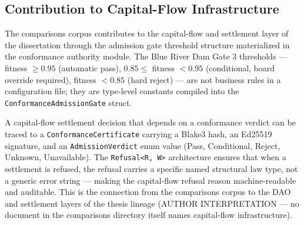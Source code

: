 \subsection{Contribution to Capital-Flow Infrastructure}
\label{sec:comparisons-contribution-capital}

The comparisons corpus contributes to the capital-flow and settlement layer of the
dissertation through the admission gate threshold structure materialized in the
conformance authority module. The Blue River Dam Gate 3 thresholds --- fitness
$\geq 0.95$ (automatic pass), $0.85 \leq$ fitness $< 0.95$ (conditional, board
override required), fitness $< 0.85$ (hard reject) --- are not business rules in
a configuration file; they are type-level constants compiled into the
\texttt{ConformanceAdmissionGate} struct.

A capital-flow settlement decision that depends on a conformance verdict can be
traced to a \texttt{ConformanceCertificate} carrying a Blake3 hash, an Ed25519
signature, and an \texttt{AdmissionVerdict} enum value (Pass, Conditional, Reject,
Unknown, Unavailable). The \texttt{Refusal<R, W>} architecture ensures that when
a settlement is refused, the refusal carries a specific named structural law
type, not a generic error string --- making the capital-flow refusal reason
machine-readable and auditable. This is the connection from the comparisons corpus
to the DAO and settlement layers of the thesis lineage (AUTHOR INTERPRETATION ---
no document in the comparisons directory itself names capital-flow infrastructure).
